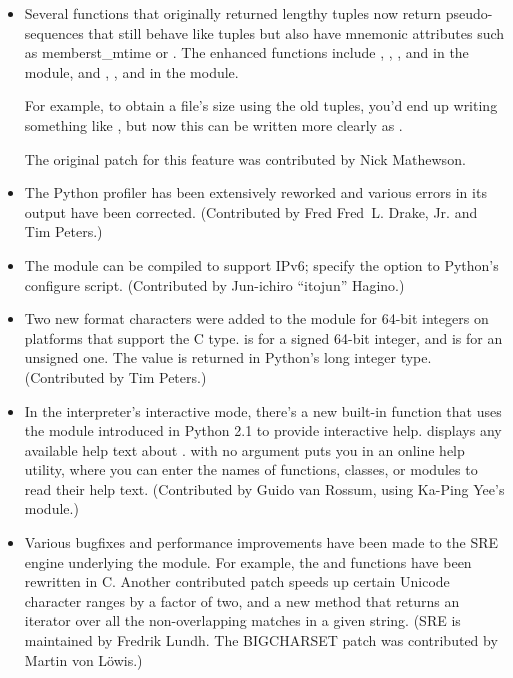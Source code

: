 \documentclass{howto}
\begin{document}
\begin{itemize}
  \item Several functions that originally returned lengthy tuples now
  return pseudo-sequences that still behave like tuples but also have
  mnemonic attributes such as member{st_mtime} or .
  The enhanced functions include ,
  , , and 
  in the  module, and ,
  , and  in the 
  module.  
  
  For example, to obtain a file's size using the old tuples, you'd end
  up writing something like , but now this can be written more
  clearly as .

   The original patch for this feature was contributed by Nick Mathewson.

  \item The Python profiler has been extensively reworked and various
  errors in its output have been corrected.  (Contributed by Fred
  Fred~L. Drake, Jr. and Tim Peters.)
 
  \item The  module can be compiled to support IPv6;
  specify the  option to Python's configure
  script.  (Contributed by Jun-ichiro ``itojun'' Hagino.)

  \item Two new format characters were added to the 
  module for 64-bit integers on platforms that support the C
   type.   is for a signed 64-bit integer,
  and  is for an unsigned one.  The value is returned in
  Python's long integer type.  (Contributed by Tim Peters.)

  \item In the interpreter's interactive mode, there's a new built-in
  function  that uses the  module
  introduced in Python 2.1 to provide interactive help.
   displays any available help text about
  .   with no argument puts you in an online
  help utility, where you can enter the names of functions, classes,
  or modules to read their help text.
  (Contributed by Guido van Rossum, using Ka-Ping Yee's  module.)

  \item Various bugfixes and performance improvements have been made
  to the SRE engine underlying the  module.  For example,
  the  and  functions have
  been rewritten in C.  Another contributed patch speeds up certain
  Unicode character ranges by a factor of two, and a new  
  method that returns an iterator over all the non-overlapping matches in 
  a given string. 
  (SRE is maintained by
  Fredrik Lundh.  The BIGCHARSET patch was contributed by Martin von
  L\"owis.)


\end{itemize}
\end{document}
